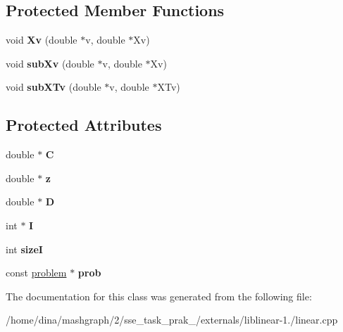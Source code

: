 \subsection*{Protected Member Functions}
\begin{DoxyCompactItemize}
\item 
\hypertarget{classl2r__l2__svc__fun_ab83903c41ab681aaa1d9aab4d1374838}{void {\bfseries Xv} (double $\ast$v, double $\ast$Xv)}\label{classl2r__l2__svc__fun_ab83903c41ab681aaa1d9aab4d1374838}

\item 
\hypertarget{classl2r__l2__svc__fun_adf89e36d329c5bf28a0d4fecbd291951}{void {\bfseries sub\-Xv} (double $\ast$v, double $\ast$Xv)}\label{classl2r__l2__svc__fun_adf89e36d329c5bf28a0d4fecbd291951}

\item 
\hypertarget{classl2r__l2__svc__fun_a45703fd51d157de907965c1a7fed4b7e}{void {\bfseries sub\-X\-Tv} (double $\ast$v, double $\ast$X\-Tv)}\label{classl2r__l2__svc__fun_a45703fd51d157de907965c1a7fed4b7e}

\end{DoxyCompactItemize}
\subsection*{Protected Attributes}
\begin{DoxyCompactItemize}
\item 
\hypertarget{classl2r__l2__svc__fun_a82624f9a736805e933b4ab26f3015a3f}{double $\ast$ {\bfseries C}}\label{classl2r__l2__svc__fun_a82624f9a736805e933b4ab26f3015a3f}

\item 
\hypertarget{classl2r__l2__svc__fun_a67629784339ccc69e86eaa3568770750}{double $\ast$ {\bfseries z}}\label{classl2r__l2__svc__fun_a67629784339ccc69e86eaa3568770750}

\item 
\hypertarget{classl2r__l2__svc__fun_af3ac92fca00c1a3b5e9f6e0f853157fc}{double $\ast$ {\bfseries D}}\label{classl2r__l2__svc__fun_af3ac92fca00c1a3b5e9f6e0f853157fc}

\item 
\hypertarget{classl2r__l2__svc__fun_a6cd9c42a6838c0626dea1f262f292d50}{int $\ast$ {\bfseries I}}\label{classl2r__l2__svc__fun_a6cd9c42a6838c0626dea1f262f292d50}

\item 
\hypertarget{classl2r__l2__svc__fun_a66791375162f879ee9a187bbc1734310}{int {\bfseries size\-I}}\label{classl2r__l2__svc__fun_a66791375162f879ee9a187bbc1734310}

\item 
\hypertarget{classl2r__l2__svc__fun_ace8b583c2a08211b6ea430f4c7b29f22}{const \hyperlink{structproblem}{problem} $\ast$ {\bfseries prob}}\label{classl2r__l2__svc__fun_ace8b583c2a08211b6ea430f4c7b29f22}

\end{DoxyCompactItemize}


The documentation for this class was generated from the following file\-:\begin{DoxyCompactItemize}
\item 
/home/dina/mashgraph/2/sse\-\_\-task\-\_\-prak\-\_/externals/liblinear-\/1./linear.\-cpp\end{DoxyCompactItemize}
